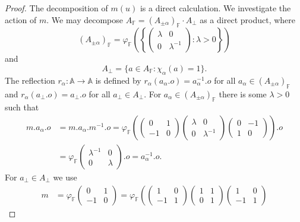 \documentclass[12pt]{amsart}
\newcommand{\F}{\mathbb{F} }
\newcommand{\A}{\mathbb{A}}
\numberwithin{equation}{section}
\theoremstyle{remark} %
\begin{document}
	\begin{proof}
		The decomposition of $m(u)$ is a direct calculation. We investigate the action of $m$. We may decompose $A_\F = (A_{\pm \alpha})_\F \cdot A_{\perp}$ as a direct product, where
		$$
		(A_{\pm \alpha})_\F = \varphi_\F \left(\left\{ \begin{pmatrix}
			\lambda & 0 \\ 0 & \lambda^{-1}
		\end{pmatrix} \colon \lambda >0 \right\}\right)
		$$
		and
		$$
		A_\perp = \{ a\in A_\F \colon \chi_\alpha(a) = 1 \}.
		$$
		The reflection $r_\alpha \colon \A \to \A$ is defined by $r_\alpha(a_\alpha.o) = a_{\alpha}^{-1}.o$ for all $a_\alpha \in (A_{\pm \alpha})_\F$ and $r_\alpha(a_\perp.o) = a_\perp.o $ for all $a_\perp \in A_\perp$. For $a_\alpha \in (A_{\pm \alpha})_\F$ there is some $\lambda >0$ such that
		\begin{align*}
			m.a_\alpha.o &= m.a_\alpha.m^{-1} . o= \varphi_\F \left(\begin{pmatrix}
				0 & 1 \\ -1 & 0
			\end{pmatrix}  \begin{pmatrix}
				\lambda & 0 \\ 0 & \lambda^{-1}
			\end{pmatrix}\begin{pmatrix}
				0 & -1 \\ 1 & 0
			\end{pmatrix} \right). o \\
			&=  \varphi_\F\begin{pmatrix}
				\lambda^{-1} & 0 \\ 0 & \lambda
			\end{pmatrix}  .o = a_\alpha^{-1}.o.
		\end{align*}
		For $a_\perp \in A_{\perp}$ we use 
		\begin{align*}
			m &= \varphi_\F \begin{pmatrix}
				0 & 1 \\ -1 & 0
			\end{pmatrix} = \varphi_\F \left( \begin{pmatrix}
				1 & 0 \\ -1 & 1
			\end{pmatrix} \begin{pmatrix}
				1 & 1 \\ 0 & 1
			\end{pmatrix} \begin{pmatrix}
				1 & 0 \\ -1 & 1

\end{pmatrix}
\end{align*}
\end{proof}
\end{document}
